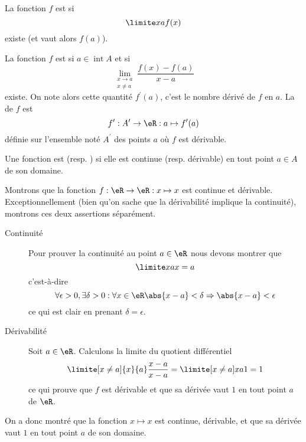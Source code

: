 \begin{definition}
    La fonction $f$ est  si
  \begin{equation*}
    \limite x a f(x)
  \end{equation*}
  existe (et vaut alors $f(a)$).
\end{definition}

\begin{definition}
    La fonction $f$ est  si $a \in
  \operatorname{int} A$ et si
  \begin{equation*}
    \lim_{\substack{x\rightarrow a\\x\neq a}} \frac{f(x)-f(a)}{x-a}
  \end{equation*}
  existe. On note alors cette quantité $f^\prime(a)$, c'est le nombre
  dérivé de $f$ en $a$. La  de $f$ est
  \begin{equation*}
    f^\prime : A^\prime \to \eR : a \mapsto f^\prime(a)
  \end{equation*}
  définie sur l'ensemble noté $A^\prime$ des points $a$ où $f$ est
  dérivable.
\end{definition}

\begin{definition}
  Une fonction est  (resp. ) si elle est continue (resp. dérivable) en tout point $a \in A$ de son domaine.
\end{definition}

\begin{example}
      Montrons que la fonction $f : \eR \to \eR : x\mapsto x$ est continue et dérivable. Exceptionnellement (bien qu'on sache que la dérivabilité implique la continuité), montrons ces deux assertions séparément.
      \begin{description}
      \item[Continuité] Pour prouver la continuité au point $a \in \eR$ nous devons montrer que
     \begin{equation}
       \limite x a x = a
     \end{equation}
     c'est-à-dire
     \begin{equation}
       \forall \epsilon > 0, \exists \delta > 0 :  \forall x \in \eR \abs{x-a} <
       \delta \Rightarrow \abs{x-a} < \epsilon
     \end{equation}
     ce qui est clair en prenant $\delta = \epsilon$.

      \item[Dérivabilité] Soit $a \in \eR$. Calculons la limite du quotient différentiel
        \begin{equation}
          \limite[x\neq a]{x}{a} \frac{x-a}{x-a} = \limite[x\neq a]x a 1 = 1
        \end{equation}
        ce qui prouve que $f$ est dérivable et que sa dérivée vaut $1$ en
        tout point $a$ de $\eR$.
      \end{description}

     On a donc montré que la fonction $x \mapsto x$ est continue, dérivable, et que sa dérivée vaut $1$ en tout point $a$ de son domaine.

\end{example}

